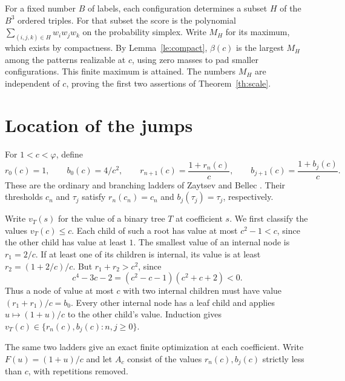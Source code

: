 \documentclass[11pt]{article}
\newcommand{\ph}{\varphi}
\begin{document}
For a fixed number $B$ of labels, each configuration determines a
subset $H$ of the $B^3$ ordered triples. For that subset the score is
the polynomial $\sum_{(i,j,k)\in H}w_iw_jw_k$ on the probability
simplex. Write $M_H$ for its maximum, which exists by compactness.
By Lemma~\ref{le:compact}, $\beta(c)$ is the largest $M_H$ among the
patterns realizable at $c$, using zero masses to pad smaller
configurations. This finite maximum is attained. The numbers $M_H$
are independent of $c$, proving the first two assertions of
Theorem~\ref{th:scale}.

\section{Location of the jumps}
For $1<c<\ph$, define
\[
 r_0(c)=1,\qquad b_0(c)=4/c^2,\qquad
 r_{n+1}(c)=\frac{1+r_n(c)}{c},\qquad
 b_{j+1}(c)=\frac{1+b_j(c)}{c}.
\]
These are the ordinary and branching ladders of Zaytsev and Bellec
\cite[\S\S6.1.4--6.1.5]{zb}. Their thresholds $c_n$ and $\tau_j$
satisfy $r_n(c_n)=c_n$ and $b_j(\tau_j)=\tau_j$, respectively.

Write $v_T(s)$ for the value of a binary tree $T$ at coefficient $s$.
We first classify the values $v_T(c)\le c$. Each child of such a root
has value at most $c^2-1<c$, since the other child has value at least $1$.
The smallest value of an internal node is $r_1=2/c$. If at least one
of its children is internal, its value is at least $r_2=(1+2/c)/c$.
But $r_1+r_2>c^2$, since
\[
 c^4-3c-2=(c^2-c-1)(c^2+c+2)<0 .
\]
Thus a node of value at most $c$ with two internal children must
have value $(r_1+r_1)/c=b_0$. Every other internal node has a leaf
child and applies $u\mapsto(1+u)/c$ to the other child's value.
Induction gives $v_T(c)\in\{r_n(c),b_j(c):n,j\ge0\}$.

The same two ladders give an exact finite optimization at each coefficient.
Write $F(u)=(1+u)/c$ and let $A_c$ consist of the values $r_n(c),b_j(c)$
strictly less than $c$, with repetitions removed.
\end{document}
